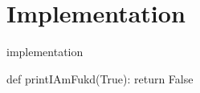 \chapter{Implementation}

implementation

\begin{python}
    def printIAmFukd(True):
        return False
\end{python}
